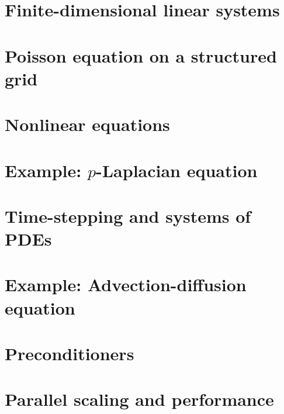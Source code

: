 \documentclass{tufte-book}
\newcommand{\CODELOC}{}  %
\newcommand{\stubinput}[2]{}
\newcommand{\stubinput}[2]{\vspace{5cm} \centerline{\LARGE Percent completed:  \Huge #2\%.} \vfill}
\theoremstyle{definition}
\begin{document}
\chapter{Finite-dimensional linear systems}
\label{chap:ls}
\renewcommand{\CODELOC}{ch2/}


\chapter{Poisson equation on a structured grid}
\label{chap:st}
\renewcommand{\CODELOC}{ch3/}


\chapter{Nonlinear equations}
\label{chap:nl}
\renewcommand{\CODELOC}{ch4/}


\chapter{Example: $p$-Laplacian equation}
\label{chap:of}
\renewcommand{\CODELOC}{ch5/}


\chapter{Time-stepping and systems of PDEs}
\label{chap:ts}
\renewcommand{\CODELOC}{ch6/}


\chapter{Example: Advection-diffusion equation}
\label{chap:ad}
\renewcommand{\CODELOC}{ch7/}


\chapter{Preconditioners}
\label{chap:pr}
\stubinput{chaps/precond.tex}{10}


\chapter{Parallel scaling and performance}
\label{chap:sc}
\renewcommand{\CODELOC}{ch9/}

\end{document}
